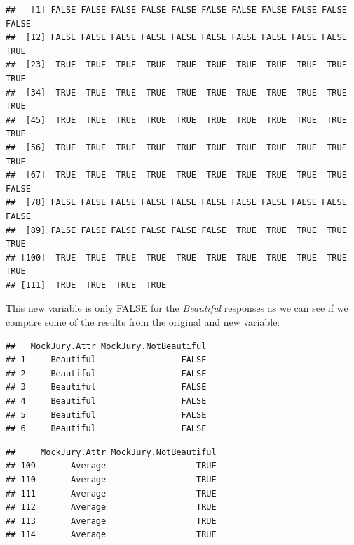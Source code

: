 \documentclass[]{book}
\newenvironment{Shaded}{\begin{snugshade}}{\end{snugshade}}
\newcommand{\KeywordTok}[1]{\textcolor[rgb]{0.13,0.29,0.53}{\textbf{#1}}}
\newcommand{\OperatorTok}[1]{\textcolor[rgb]{0.81,0.36,0.00}{\textbf{#1}}}
\newcommand{\NormalTok}[1]{#1}
\theoremstyle{definition}
\theoremstyle{definition}
\theoremstyle{remark}
\begin{document}
\begin{verbatim}
##   [1] FALSE FALSE FALSE FALSE FALSE FALSE FALSE FALSE FALSE FALSE FALSE
##  [12] FALSE FALSE FALSE FALSE FALSE FALSE FALSE FALSE FALSE FALSE  TRUE
##  [23]  TRUE  TRUE  TRUE  TRUE  TRUE  TRUE  TRUE  TRUE  TRUE  TRUE  TRUE
##  [34]  TRUE  TRUE  TRUE  TRUE  TRUE  TRUE  TRUE  TRUE  TRUE  TRUE  TRUE
##  [45]  TRUE  TRUE  TRUE  TRUE  TRUE  TRUE  TRUE  TRUE  TRUE  TRUE  TRUE
##  [56]  TRUE  TRUE  TRUE  TRUE  TRUE  TRUE  TRUE  TRUE  TRUE  TRUE  TRUE
##  [67]  TRUE  TRUE  TRUE  TRUE  TRUE  TRUE  TRUE  TRUE  TRUE  TRUE FALSE
##  [78] FALSE FALSE FALSE FALSE FALSE FALSE FALSE FALSE FALSE FALSE FALSE
##  [89] FALSE FALSE FALSE FALSE FALSE FALSE  TRUE  TRUE  TRUE  TRUE  TRUE
## [100]  TRUE  TRUE  TRUE  TRUE  TRUE  TRUE  TRUE  TRUE  TRUE  TRUE  TRUE
## [111]  TRUE  TRUE  TRUE  TRUE
\end{verbatim}

This new variable is only FALSE for the \emph{Beautiful} responses as we
can see if we compare some of the results from the original and new
variable:

\begin{Shaded}
\end{Shaded}

\begin{verbatim}
##   MockJury.Attr MockJury.NotBeautiful
## 1     Beautiful                 FALSE
## 2     Beautiful                 FALSE
## 3     Beautiful                 FALSE
## 4     Beautiful                 FALSE
## 5     Beautiful                 FALSE
## 6     Beautiful                 FALSE
\end{verbatim}

\newpage

\begin{Shaded}
\end{Shaded}

\begin{verbatim}
##     MockJury.Attr MockJury.NotBeautiful
## 109       Average                  TRUE
## 110       Average                  TRUE
## 111       Average                  TRUE
## 112       Average                  TRUE
## 113       Average                  TRUE
## 114       Average                  TRUE
\end{verbatim}
\end{document}
